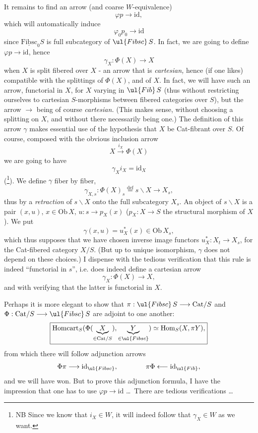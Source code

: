 
It remains to find an arrow (and coarse $W$-equivalence)
\[\varphi p \longrightarrow \mathrm{id},\]
which will automatically induce
\[\varphi_0 p_0 \longrightarrow \mathrm{id}\]
since $\underline{\mathrm{Fibsc}}_0 S$ is full subcategory of $\ul{Fibsc}\,S$. In fact, we are going to define $\varphi p \longrightarrow \mathrm{id}$, hence
\[\boxed{\gamma_X : \Phi(X) \longrightarrow X}\]
when $X$ is split fibered over $X$ - an arrow that is \textit{cartesian,} hence (if one likes) compatible with the splittings of $\Phi(X)$, and of $X$. In fact, we will have such an arrow, functorial in $X$, for $X$ varying in $\ul{Fib}\,S$ (thus without restricting ourselves to cartesian $S$-morphisms between fibered categories over $S$), but the arrow $\longrightarrow$ being of course \textit{cartesian.} (This makes sense, without choosing a splitting on $X$, and without there necessarily being one.) The definition of this arrow $\gamma$ makes essential use of the hypothesis that $X$ be Cat-fibrant over $S$. Of course, composed with the obvious inclusion arrow %
\[X \xrightarrow{i_X} \Phi(X)\]
we are going to have
\[\gamma_X i_X = \mathrm{id}_X\]
(\footnote[39]{NB Since we know that $i_X \in W$, it will indeed follow that $\gamma_X \in W$ as we want.}). We define $\gamma$ fiber by fiber,
\[\gamma_{X,s} : \Phi(X)_s \overset{\text{def}}{=} s\backslash X \longrightarrow X_s,\]
thus by a \textit{retraction} of $s\backslash X$ onto the full subcategory $X_s$. An object of $s\backslash X$ is a pair $(x,u)$, $x \in \mathrm{Ob}\, X$, $u : s \longrightarrow p_X(x)$ ($p_X : X \longrightarrow S$ the structural morphism of $X$). We put
\[\gamma(x,u) = u_X^*(x) \in \mathrm{Ob}\, X_s,\]
which thus supposes that we have chosen inverse image functors $u_X^* : X_t \longrightarrow X_s$, for the Cat-fibered category $X/S$. (But up to unique isomorphism, $\gamma$ does not depend on these choices.) I dispense with the tedious verification that this rule is indeed ``functorial in $s$'', i.e. does indeed define a cartesian arrow
\[\gamma_X : \Phi(X) \longrightarrow X,\]
and with verifying that the latter is functorial in $X$.


Perhaps it is more elegant to show that $\pi : \ul{Fibsc}\,S \longrightarrow \mathrm{Cat}/S$ and $\Phi : \mathrm{Cat}/S \longrightarrow \ul{Fibsc}\,S$ are adjoint to one another:
\[\boxed{\mathrm{Homcart}_S(\Phi(\underbrace{\;X\;}_{\in\mathrm{Cat}/S}),\underbrace{\;Y\;}_{\in\ul{Fibsc}}) \simeq \mathrm{Hom}_S(X,\pi Y),}\]
from which there will follow adjunction arrows
\[\Phi\pi \longrightarrow \mathrm{id}_{\ul{Fibsc}}, \qquad\qquad \pi\Phi \longleftarrow \mathrm{id}_{\ul{Fib}},\]
 and we will have won. But to prove this adjunction formula, I have the impression that one has to use $\varphi p \longrightarrow \mathrm{id}$ \ldots\ There are tedious verifications \ldots


